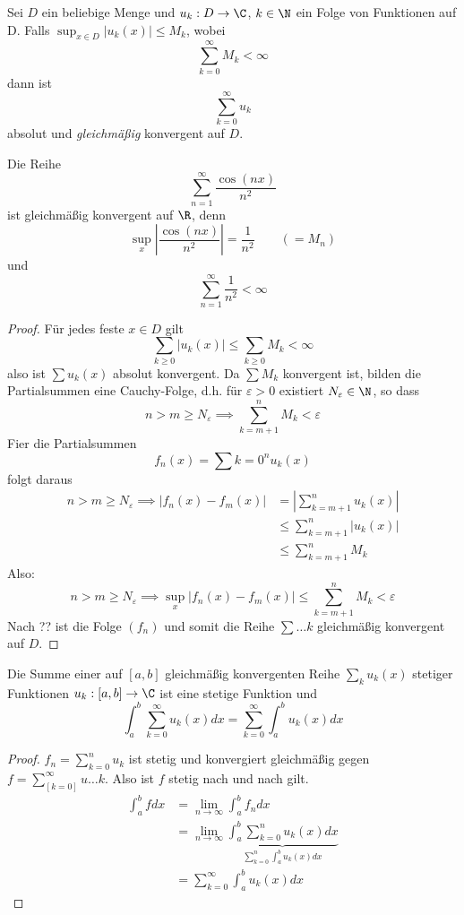 \documentclass[a4paper,10pt]{scrartcl}
\begin{document}
\begin{thm}
Sei $D$ ein beliebige Menge und $u_k:D\to\C$, $k\in\N$ ein Folge von Funktionen auf D.
Falls $\sup_{x\in D}|u_k(x)|\le M_k$, wobei
\[
\sum_{k=0}^\infty M_k<\infty
\]
dann ist 
\[
\sum_{k=0}^\infty u_k
\]
absolut und \emph{gleichmäßig} konvergent auf $D$.
\begin{ex*}
Die Reihe
\[
\sum_{n=1}^\infty \frac{\cos(nx)}{n^2}
\]
ist gleichmäßig konvergent auf $\R$, denn
\[
\sup_x\left|\frac{\cos(nx)}{n^2}\right|=\frac 1{n^2}\qquad (=M_n)
\]
und
\[
\sum_{n=1}^\infty\frac 1{n^2}<\infty
\]
\end{ex*}
\begin{proof}
Für jedes feste $x \in D$ gilt
\[
\sum_{k\ge 0} |u_k(x)|\le \sum_{k\ge 0}M_k <\infty
\]
also ist $\sum u_k(x)$ absolut konvergent.
Da $\sum M_k$ konvergent ist, bilden die Partialsummen eine Cauchy-Folge, d.h. für $\varepsilon>0$ existiert $N_\varepsilon\in \N$, so dass
\[
n>m\ge N_\varepsilon \implies \sum_{k=m+1}^n M_k <\varepsilon
\]
Fier die Partialsummen
\[
f_n(x)=\sum{k=0}^n u_k(x)
\]
folgt daraus
\begin{align*}
n>m\ge N_\varepsilon \implies |f_n(x)-f_m(x)| &= |\sum_{k=m+1}^n u_k(x)|\\
&\le \sum_{k=m+1}^n |u_k(x)|\\
&\le \sum_{k=m+1}^n M_k
\end{align*}
Also:
\[
n>m\ge N_\varepsilon \implies \sup_x|f_n(x)-f_m(x)| \le \sum_{k=m+1}^n M_k < \varepsilon
\]
Nach ?? ist die Folge $(f_n)$ und somit die Reihe $\sum …k$ gleichmäßig konvergent auf $D$.
\end{proof}
\end{thm}

\begin{st}
Die Summe einer auf $[a,b]$ gleichmäßig konvergenten Reihe
$\sum_k u_k(x)$ stetiger Funktionen $u_k:[a,b]\to\C$ ist eine stetige Funktion und
\[
\int_a^b\sum_{k=0}^\infty u_k(x)dx = \sum_{k=0}^\infty\int_a^b u_k(x)dx
\]
\begin{proof}
$f_n =\sum_{k=0}^n u_k$ ist stetig und konvergiert gleichmäßig gegen $f=\sum_[k=0]^\infty u…k$.
Also ist $f$ stetig nach \fixme[thm??] und nach \fixme[thm??] gilt.
\begin{align*}
\int_a^b fdx
&=\lim_{n\to\infty}\int_a^b f_ndx\\
&=\lim_{n\to\infty} \underbrace{\int_a^b \sum_{k=0}^n u_k(x)dx}_{\sum_{k=0}^n\int_a^b u_k(x)dx}\\
&=\sum_{k=0}^\infty\int_a^b u_k(x)dx
\end{align*}
\end{proof}
\end{st}
\end{document}
